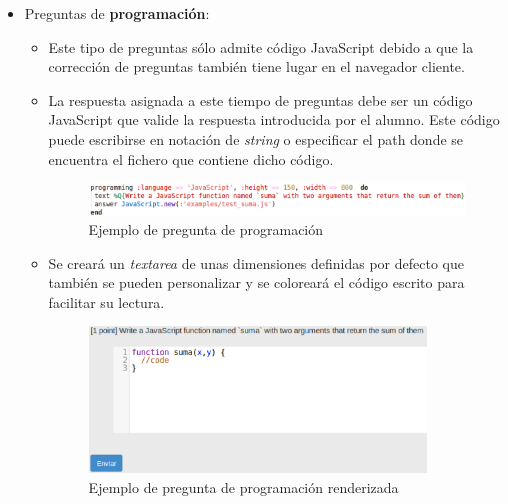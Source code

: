 \begin{itemize}
\begin{itemize}
    \item Preguntas de {\bfseries programaci\'on}:
    \begin{itemize}
      \item Este tipo de preguntas s\'olo admite c\'odigo JavaScript debido a que la correcci\'on de preguntas tambi\'en 
      tiene lugar en el navegador cliente.
      \item La respuesta asignada a este tiempo de preguntas debe ser un c\'odigo JavaScript que valide la respuesta introducida
      por el alumno. Este c\'odigo puede escribirse en notaci\'on de \textit{string} o especificar el path donde se encuentra el
      fichero que contiene dicho c\'odigo.
      
      \begin{figure}[!th]
      \begin{center}
      \includegraphics[width=1.1\textwidth,height=0.1\textwidth]{images/programming1.eps}
      \caption{Ejemplo de pregunta de programaci\'on}
      \label{fig:programming1}
      \end{center}
      \end{figure}
      \newpage
      
      \item Se crear\'a un \textit{textarea} de unas dimensiones definidas por defecto que tambi\'en se pueden personalizar
      y se colorear\'a el c\'odigo escrito para facilitar su lectura.
      
      \begin{figure}[!th]
      \begin{center}
      \includegraphics[width=0.9\textwidth]{images/programming1r.eps}
      \caption{Ejemplo de pregunta de programaci\'on renderizada}
      \label{fig:programming1r}
      \end{center}
      \end{figure}
      

\end{itemize}
\end{itemize}
\end{itemize}
